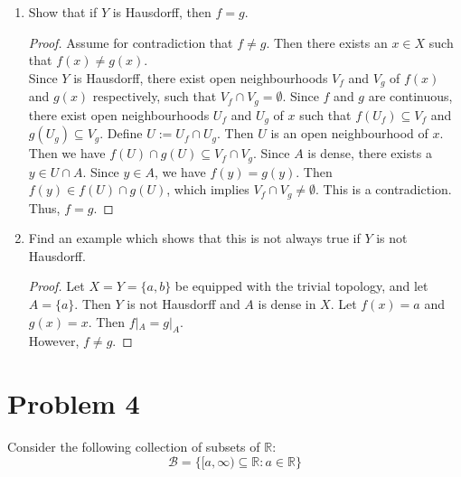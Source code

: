 \documentclass[a4paper,11pt]{article}
\newcommand{\R}{\mathbb{R}}
\newcommand{\B}{\mathcal{B}}
\begin{document}
\begin{enumerate}[label=\textbf{(\alph*)}]
    \item Show that if $Y$ is Hausdorff, then $f = g$.
    \begin{proof}
        Assume for contradiction that $f \neq g$.
        Then there exists an $x \in X$ such that $f(x) \neq g(x)$. \\
        Since $Y$ is Hausdorff, there exist open neighbourhoods $V_f$ and $V_g$ of $f(x)$ and $g(x)$ respectively, such that $V_f \cap V_g = \emptyset$.
        Since $f$ and $g$ are continuous, there exist open neighbourhoods $U_f$ and $U_g$ of $x$ such that $f(U_f) \subseteq V_f$ and $g(U_g) \subseteq V_g$.
        Define $U := U_f \cap U_g$. Then $U$ is an open neighbourhood of $x$. 
        Then we have $f(U) \cap g(U) \subseteq V_f \cap V_g$. 
        Since $A$ is dense, there exists a $y \in U \cap A$. Since $y \in A$, we have $f(y) = g(y)$. 
        Then $f(y) \in f(U) \cap g(U)$, which implies $V_f \cap V_g \neq \emptyset$. This is a contradiction. Thus, $f=g$.
    \end{proof}

    \item Find an example which shows that this is not always true if $Y$ is not Hausdorff.
    \begin{proof}
        Let $X = Y = \{a,b\}$ be equipped with the trivial topology, and let $A=\{a\}$.
        Then $Y$ is not Hausdorff and $A$ is dense in $X$.
        Let $f(x)=a$ and $g(x)=x$. Then $f|_A = g|_A$. \\
        However, $f \neq g$.
    \end{proof}
\end{enumerate}

\section*{Problem 4}
Consider the following collection of subsets of $\R$:
\[\B = \{[a,\infty) \subseteq \R \colon a \in \R\}\]
\end{document}
